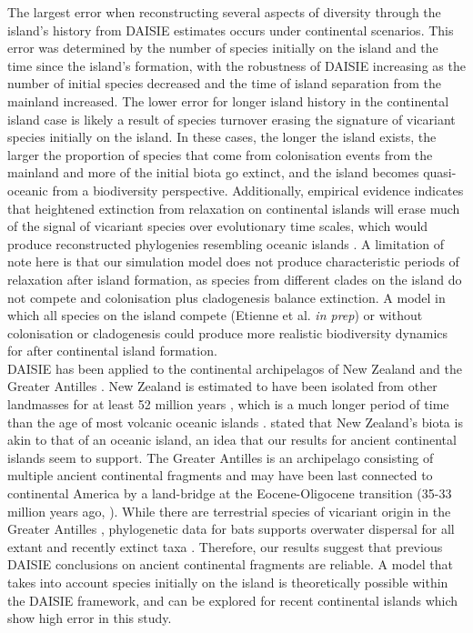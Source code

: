 \documentclass{article}
\begin{document}
The largest error when reconstructing several aspects of diversity through the island’s history from DAISIE estimates occurs under continental scenarios. This error was determined by the number of species initially on the island and the time since the island’s formation, with the robustness of DAISIE increasing as the number of initial species decreased and the time of island separation from the mainland increased. The lower error for longer island history in the continental island case is likely a result of species turnover erasing the signature of vicariant species initially on the island. In these cases, the longer the island exists, the larger the proportion of species that come from colonisation events from the mainland and more of the initial biota go extinct, and the island becomes quasi-oceanic from a biodiversity perspective. Additionally, empirical evidence indicates that heightened extinction from relaxation on continental islands will erase much of the signal of vicariant species over evolutionary time scales, which would produce reconstructed phylogenies resembling oceanic islands \citep{diamond_biogeographic_1972, halley_dynamics_2016}. A limitation of note here is that our simulation model does not produce characteristic periods of relaxation after island formation, as species from different clades on the island do not compete and colonisation plus cladogenesis balance extinction. A model in which all species on the island compete (Etienne et al. \textit{in prep}) or without colonisation or cladogenesis \citep{halley_neutral_2011} could produce more realistic biodiversity dynamics for after continental island formation.  \\

DAISIE has been applied to the continental archipelagos of New Zealand \citep{valente_deep_2019} and the Greater Antilles  \citep{valente_recent_2017}. New Zealand is estimated to have been isolated from other landmasses for at least 52 million years \citep{schellart_late_2006}, which is a much longer period of time than the age of most volcanic oceanic islands \citep{valente_simple_2020}. \cite{wallace_island_1880} stated that New Zealand’s biota is akin to that of an oceanic island, an idea that our results for ancient continental islands seem to support. The Greater Antilles is an archipelago consisting of multiple ancient continental fragments and may have been last connected to continental America by a land-bridge at the Eocene-Oligocene transition (35-33 million years ago, \cite{iturralde_paleogeography_1999}). While there are terrestrial species of vicariant origin in the Greater Antilles \citep{brace_unexpected_2015}, phylogenetic data for bats supports overwater dispersal for all extant and recently extinct taxa \citep{valente_equilibrium_2017}. Therefore, our results suggest that previous DAISIE conclusions on ancient continental fragments are reliable. A model that takes into account species initially on the island is theoretically possible within the DAISIE framework, and can be explored for recent continental islands which show high error in this study. \\
\end{document}

